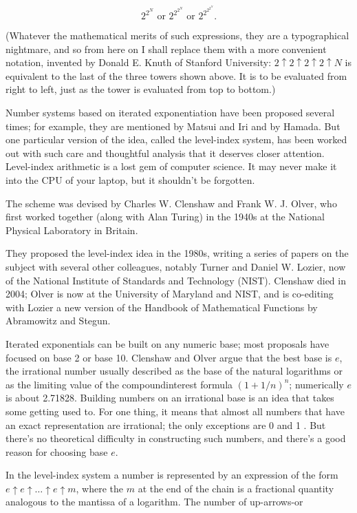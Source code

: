 \documentclass[10pt]{article}
\begin{document}
$$
2^{2^{N}} \text { or } 2^{2^{2^{N}}} \text { or } 2^{2^{2^{2^{N}}}} .
$$

(Whatever the mathematical merits of such expressions, they are a typographical nightmare, and so from here on I shall replace them with a more convenient notation, invented by Donald E. Knuth of Stanford University: $2 \uparrow 2 \uparrow 2 \uparrow 2 \uparrow N$ is equivalent to the last of the three towers shown above. It is to be evaluated from right to left, just as the tower is evaluated from top to bottom.)

Number systems based on iterated exponentiation have been proposed several times; for example, they are mentioned by Matsui and Iri and by Hamada. But one particular version of the idea, called the level-index system, has been worked out with such care and thoughtful analysis that it deserves closer attention. Level-index arithmetic is a lost gem of computer science. It may never make it into the CPU of your laptop, but it shouldn't be forgotten.

The scheme was devised by Charles W. Clenshaw and Frank W. J. Olver, who first worked together (along with Alan Turing) in the 1940s at the National Physical Laboratory in Britain.

They proposed the level-index idea in the 1980s, writing a series of papers on the subject with several other colleagues, notably Turner and Daniel W. Lozier, now of the National Institute of Standards and Technology (NIST). Clenshaw died in 2004; Olver is now at the University of Maryland and NIST, and is co-editing with Lozier a new version of the Handbook of Mathematical Functions by Abramowitz and Stegun.

Iterated exponentials can be built on any numeric base; most proposals have focused on base 2 or base 10. Clenshaw and Olver argue that the best base is $e$, the irrational number usually described as the base of the natural logarithms or as the limiting value of the compoundinterest formula $(1+1 / n)^{n}$; numerically $e$ is about 2.71828. Building numbers on an irrational base is an idea that takes some getting used to. For one thing, it means that almost all numbers that have an exact representation are irrational; the only exceptions are 0 and 1 . But there's no theoretical difficulty in constructing such numbers, and there's a good reason for choosing base $e$.

In the level-index system a number is represented by an expression of the form $e \uparrow e \uparrow \ldots \uparrow e \uparrow m$, where the $m$ at the end of the chain is a fractional quantity analogous to the mantissa of a logarithm. The number of up-arrows-or
\end{document}
